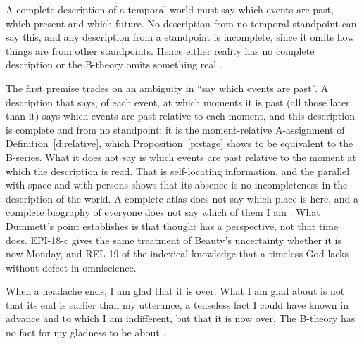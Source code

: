 \documentclass{situationist-preprint}
\begin{document}
\begin{objection}\label{o:dummett}
A complete description of a temporal world must say which events are past, which present and which future. No description from no temporal standpoint can say this, and any description from a standpoint is incomplete, since it omits how things are from other standpoints. Hence either reality has no complete description or the B-theory omits something real \citep{Dummett1960}.
\end{objection}

\begin{reply}
The first premise trades on an ambiguity in \enquote{say which events are past}. A description that says, of each event, at which moments it is past (all those later than it) says which events are past relative to each moment, and this description is complete and from no standpoint: it is the moment-relative A-assignment of Definition~\ref{d:relative}, which Proposition~\ref{p:stage} shows to be equivalent to the B-series. What it does not say is which events are past relative to the moment at which the description is read. That is self-locating information, and the parallel with space and with persons shows that its absence is no incompleteness in the description of the world. A complete atlas does not say which place is here, and a complete biography of everyone does not say which of them I am \citep{Perry1979,Lewis1979}. What Dummett's point establishes is that thought has a perspective, not that time does. EPI-18-c gives the same treatment of Beauty's uncertainty whether it is now Monday, and REL-19 of the indexical knowledge that a timeless God lacks without defect in omniscience.
\end{reply}

\begin{objection}\label{o:prior}
When a headache ends, I am glad that it is over. What I am glad about is not that its end is earlier than my utterance, a tenseless fact I could have known in advance and to which I am indifferent, but that it is now over. The B-theory has no fact for my gladness to be about \citep{Prior1959}.
\end{objection}
\end{document}
